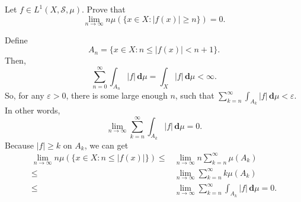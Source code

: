 \documentclass[12pt]{article}
\newcounter{problem}
\newenvironment{exercise}{\begin{tcolorbox}[colback=black!15, colframe=black!80, breakable, title=\refstepcounter{problem}\theproblem]}{\end{tcolorbox}}
\newenvironment{proof}{\begin{tcolorbox}[colback=white, colframe=black!50, breakable, title=Proof. ]\setlength{\parskip}{0.8em}}{\end{tcolorbox}}
\newcommand{\der}{\,\mathbf{d}}
\begin{document}
    \begin{exercise}
        Let $f\in L^1(X,\mathscr{S},\mu)$. Prove that
        \[
            \lim_{n\to\infty}n\mu(\{x\in X: |f(x)|\geqslant n\})=0. 
        \]
    \end{exercise}

    \begin{proof}
        Define
        \[
            A_n=\{x\in X: n\leqslant|f(x)|< n+1\}. 
        \]
        Then, 
        \[
            \sum_{n=0}^\infty\int_{A_n}|f|\der \mu=\int_X|f|\der \mu<\infty. 
        \]
        So, for any $\varepsilon>0$, there is some large enough $n$, such that $\sum_{k=n}^\infty\int_{A_k}|f|\der \mu<\varepsilon$. In other words, 
        \[
            \lim_{n\to\infty}\sum_{k=n}^\infty\int_{A_k}|f|\der \mu=0. 
        \]
        Because $|f|\geqslant k$ on $A_k$, we can get 
        \[
            \begin{aligned}
                \lim_{n\to\infty}n\mu(\{x\in X: n\leqslant|f(x)|\})
                \leqslant&\lim_{n\to\infty}n\sum_{k=n}^\infty\mu(A_k)\\
                \leqslant&\lim_{n\to\infty}\sum_{k=n}^\infty k\mu(A_k)\\
                \leqslant&\lim_{n\to\infty}\sum_{k=n}^\infty\int_{A_k}|f|\der \mu=0. 
            \end{aligned}
        \]
    \end{proof}

\end{document}
